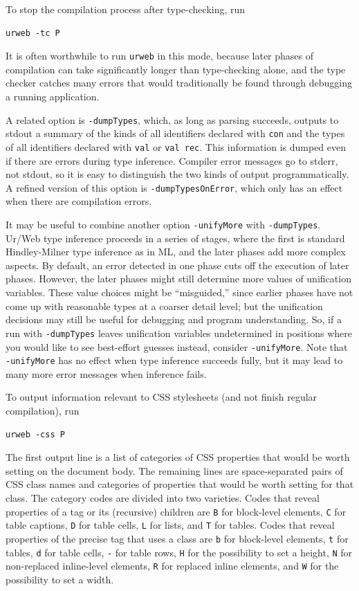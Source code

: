 \documentclass{article}
\newcommand{\cd}[1]{\texttt{#1}}
\begin{document}
To stop the compilation process after type-checking, run
\begin{verbatim}
urweb -tc P
\end{verbatim}
It is often worthwhile to run \cd{urweb} in this mode, because later phases of compilation can take significantly longer than type-checking alone, and the type checker catches many errors that would traditionally be found through debugging a running application.

A related option is \cd{-dumpTypes}, which, as long as parsing succeeds, outputs to stdout a summary of the kinds of all identifiers declared with \cd{con} and the types of all identifiers declared with \cd{val} or \cd{val rec}.  This information is dumped even if there are errors during type inference.  Compiler error messages go to stderr, not stdout, so it is easy to distinguish the two kinds of output programmatically.  A refined version of this option is \cd{-dumpTypesOnError}, which only has an effect when there are compilation errors.

It may be useful to combine another option \cd{-unifyMore} with \cd{-dumpTypes}.  Ur/Web type inference proceeds in a series of stages, where the first is standard Hindley-Milner type inference as in ML, and the later phases add more complex aspects.  By default, an error detected in one phase cuts off the execution of later phases.  However, the later phases might still determine more values of unification variables.  These value choices might be ``misguided,'' since earlier phases have not come up with reasonable types at a coarser detail level; but the unification decisions may still be useful for debugging and program understanding.  So, if a run with \cd{-dumpTypes} leaves unification variables undetermined in positions where you would like to see best-effort guesses instead, consider \cd{-unifyMore}.  Note that \cd{-unifyMore} has no effect when type inference succeeds fully, but it may lead to many more error messages when inference fails.

To output information relevant to CSS stylesheets (and not finish regular compilation), run
\begin{verbatim}
urweb -css P
\end{verbatim}
The first output line is a list of categories of CSS properties that would be worth setting on the document body.  The remaining lines are space-separated pairs of CSS class names and categories of properties that would be worth setting for that class.  The category codes are divided into two varieties.  Codes that reveal properties of a tag or its (recursive) children are \cd{B} for block-level elements, \cd{C} for table captions, \cd{D} for table cells, \cd{L} for lists, and \cd{T} for tables.  Codes that reveal properties of the precise tag that uses a class are \cd{b} for block-level elements, \cd{t} for tables, \cd{d} for table cells, \cd{-} for table rows, \cd{H} for the possibility to set a height, \cd{N} for non-replaced inline-level elements, \cd{R} for replaced inline elements, and \cd{W} for the possibility to set a width.
\end{document}
